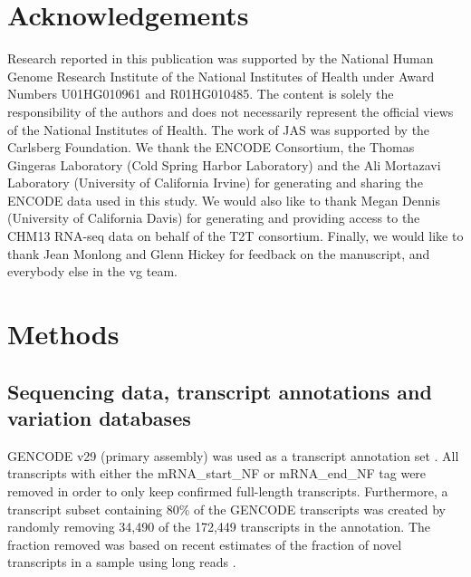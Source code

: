 \documentclass[11pt]{ucthesis}
\begin{document}
\section{Acknowledgements}

Research reported in this publication was supported by the National Human Genome Research Institute of the National Institutes of Health under Award Numbers U01HG010961 and R01HG010485. The content is solely the responsibility of the authors and does not necessarily represent the official views of the National Institutes of Health. The work of JAS was supported by the Carlsberg Foundation. We thank the ENCODE Consortium, the Thomas Gingeras Laboratory (Cold Spring Harbor Laboratory) and the Ali Mortazavi Laboratory (University of California Irvine) for generating and sharing the ENCODE data used in this study. We would also like to thank Megan Dennis (University of California Davis) for generating and providing access to the CHM13 RNA-seq data on behalf of the T2T consortium. Finally, we would like to thank Jean Monlong and Glenn Hickey for feedback on the manuscript, and everybody else in the vg team.

\section{Methods}

\subsection{Sequencing data, transcript annotations and variation databases}

GENCODE v29 (primary assembly) was used as a transcript annotation set \cite{frankish2019gencode}. All transcripts with either the mRNA\_start\_NF or mRNA\_end\_NF tag were removed in order to only keep confirmed full-length transcripts. Furthermore, a transcript subset containing 80\% of the GENCODE transcripts was created by randomly removing 34,490 of the 172,449 transcripts in the annotation. The fraction removed was based on recent estimates of the fraction of novel transcripts in a sample using long reads \cite{wyman2019technology}.
\end{document}
